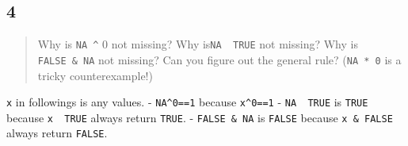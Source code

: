 \documentclass[]{article}
\begin{document}
\hypertarget{section-11}{%
\subsection{4}\label{section-11}}

\begin{quote}
Why is \texttt{NA\ \^{}} 0 not missing? Why
is\texttt{NA\ \textbar{}\ TRUE} not missing? Why is
\texttt{FALSE\ \&\ NA} not missing? Can you figure out the general rule?
(\texttt{NA\ *\ 0} is a tricky counterexample!)
\end{quote}

\texttt{x} in followings is any values. - \texttt{NA\^{}0==1} because
\texttt{x\^{}0==1} - \texttt{NA\ \textbar{}\ TRUE} is \texttt{TRUE}
because \texttt{x\ \textbar{}\ TRUE} always return \texttt{TRUE}. -
\texttt{FALSE\ \&\ NA} is \texttt{FALSE} because \texttt{x\ \&\ FALSE}
always return \texttt{FALSE}.
\end{document}

